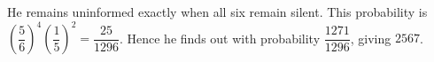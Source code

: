 He remains uninformed exactly when all six remain silent. This probability is $\left(\dfrac{5}{6}\right)^4\left(\dfrac{1}{5}\right)^2=\dfrac{25}{1296}$. Hence he finds out with probability $\dfrac{1271}{1296}$, giving $\boxed{2567}$.
